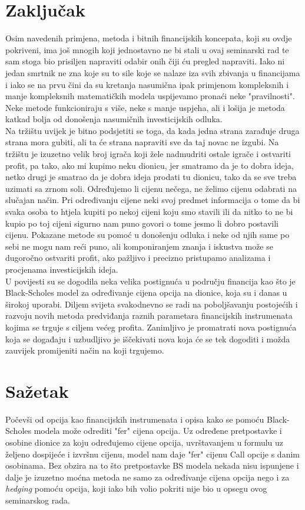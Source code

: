 \documentclass[times, utf8, seminar]{fer}
\begin{document}
\chapter{Zaključak}
Osim navedenih primjena, metoda i bitnih financijskih koncepata, koji su ovdje pokriveni, ima još mnogih koji jednostavno ne bi stali u ovaj seminarski rad te sam stoga bio prisiljen napraviti odabir onih čiji ću pregled napraviti. Iako ni jedan smrtnik ne zna koje su to sile koje se nalaze iza svih zbivanja u financijama i iako se na prvu čini da su kretanja nasumična ipak primjenom kompleksnih i manje kompleksnih matematičkih modela uspijevamo pronaći neke "pravilnosti". Neke metode funkcioniraju s više, neke s manje uspjeha, ali i lošija je metoda katkad bolja od donošenja nasumičnih investicijskih odluka.\\
Na tržištu uvijek je bitno podsjetiti se toga, da kada jedna strana zarađuje druga strana mora gubiti, ali ta će strana napraviti sve da taj novac ne izgubi. Na tržištu je izuzetno velik broj igrača koji žele nadmudriti ostale igrače i ostvariti profit, pa tako, ako mi kupimo neku dionicu, jer smatramo da je to dobra ideja, netko drugi je smatrao da je dobra ideja prodati tu dionicu, tako da se sve treba uzimati sa zrnom soli. Određujemo li cijenu nečega, ne želimo cijenu odabrati na slučajan način. Pri određivanju cijene neki svoj predmet informacija o tome da bi svaka osoba to htjela kupiti po nekoj cijeni koju smo stavili ili da nitko to ne bi kupio po toj cijeni sigurno nam puno govori o tome jesmo li dobro postavili cijenu. Pokazane metode su pomoć u donošenju odluka i neke od njih same po sebi ne mogu nam reći puno, ali komponiranjem znanja i iskustva može se dugoročno ostvariti profit, ako pažljivo i precizno pristupamo analizama i procjenama investicijskih ideja. \\
U povijesti su se dogodila neka velika postignuća u području financija kao što je Black-Scholes model za određivanje cijena opcija na dionice, koja su i danas u širokoj uporabi. Diljem svijeta svakodnevno se radi na poboljšavanju postojećih i razvoju novih metoda predviđanja raznih parametara financijskih instrumenata kojima se trguje s ciljem većeg profita. Zanimljivo je promatrati nova postignuća koja se događaju i uzbudljivo je iščekivati nova koja će se tek dogoditi i možda zauvijek promijeniti način na koji trgujemo.



\nocite{*}

\chapter{Sažetak}
Počevši od opcija kao financijskih instrumenata i opisa kako se pomoću Black-Scholes modela može odrediti "fer" cijena opcija. Uz određene pretpostavke i osobine dionice za koju određujemo cijene opcija, uvrštavanjem u formulu uz željeno dospijeće i izvršnu cijenu, model nam daje "fer" cijenu Call opcije s danim osobinama. Bez obzira na to što pretpostavke BS modela nekada nisu ispunjene i dalje je izuzetno moćna metoda ne samo za određivanje cijena opcija nego i za \textit{hedging} pomoću opcija, koji iako bih volio pokriti nije bio u opsegu ovog seminarskog rada.
\end{document}
